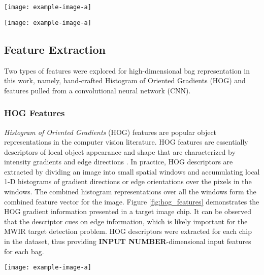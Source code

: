 \begin{center}
	\begin{figure*}[h]
		\centering
		\texttt{[image: example-image-a]}
		\caption[Image Chip Extraction]{}
		\label{fig:chip_extraction}
	\end{figure*}
\end{center}

\begin{center}
	\begin{figure*}[h]
		\centering
		\texttt{[image: example-image-a]}
		\caption[Image Chip Extraction]{}
		\label{fig:chip_uncertainty}
	\end{figure*}
\end{center}

\subsection{Feature Extraction}
Two types of features were explored for high-dimensional bag representation in this work, namely, hand-crafted Histogram of Oriented Gradients (HOG) and features pulled from a convolutional neural network (CNN).  

\subsubsection{HOG Features}

\textit{Histogram of Oriented Gradients} (HOG) features are popular object representations in the computer vision literature.  HOG features are essentially descriptors of local object appearance and shape that are characterized by intensity gradients and edge directions \citep{Dalal2005HOG}.  In practice, HOG descriptors are extracted by dividing an image into small spatial windows and accumulating local 1-D histograms of gradient directions or edge orientations over the pixels in the windows.  The combined histogram representations over all the windows form the combined feature vector for the image.  Figure \ref{fig:hog_features} demonstrates the HOG gradient information presented in a target image chip.  It can be observed that the descriptor cues on edge information, which is likely important for the MWIR target detection problem.  HOG descriptors were extracted for each chip in the dataset, thus providing \textbf{INPUT NUMBER}-dimensional input features for each bag.  

\begin{center}
	\begin{figure*}[h]
		\centering
		\texttt{[image: example-image-a]}
		\caption[HOG features]{}
		\label{fig:hog_features}
	\end{figure*}
\end{center}

